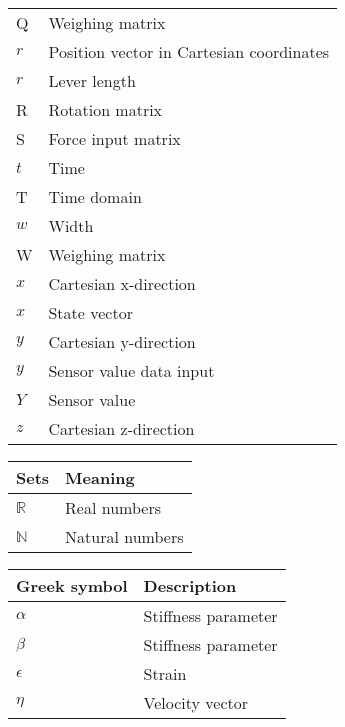 \begin{spacing}{0.9}
\begin{multicols}{2}
\begin{table}[H]
\begin{tabular}{p{1.5cm} p{5cm}}
    Q     & Weighing matrix \\
    $r$     & Position vector in Cartesian coordinates \\
    $r$     & Lever length \\
    R     & Rotation matrix \\
    S     & Force input matrix \\
    $t$     & Time \\
    T     & Time domain \\
    $w$     & Width \\
    W     & Weighing matrix \\
    $x$     & Cartesian x-direction \\
    $x$     & State vector \\
    $y$     & Cartesian y-direction \\
    $y$     & Sensor value data input \\
    $Y$     & Sensor value \\
    $z$     & Cartesian z-direction \\ \hline
    \end{tabular}
\end{table}

\begin{table}[H]
\centering
    \begin{tabular}{p{1.5cm} p{5cm}} \hline
    \textbf{Sets}    &   \textbf{Meaning }\\ \hline
    $\mathbb{R}$     &  Real numbers \\
    $\mathbb{N}$     &  Natural numbers \\  \hline
    \end{tabular}
\end{table}



\begin{table}[H]
\centering
    \begin{tabular}{p{2.8cm} p{3.2cm}} \hline
    \textbf{Greek symbol}    &   \textbf{Description }\\ \hline
    $\alpha$     &  Stiffness parameter \\
    $\beta$     &  Stiffness parameter \\
    $\epsilon$     &  Strain \\
    $\eta$     &  Velocity vector \\
    

\end{tabular}
\end{table}
\end{multicols}
\end{spacing}
